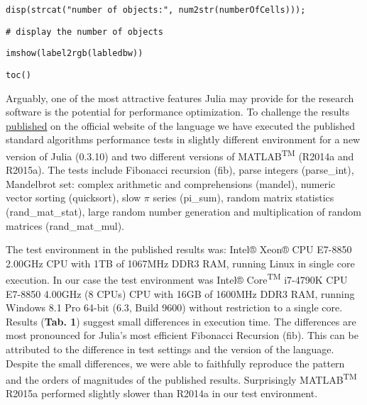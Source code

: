 \verb|disp(strcat("number of objects:", num2str(numberOfCells)));|

\verb|# display the number of objects|

\verb|imshow(label2rgb(labledbw))|

\verb|toc()|



Arguably, one of the most attractive features Julia may provide for the research software is the potential for performance optimization. To challenge the results \href{http://julialang.org/benchmarks/}{published} on the official website of the language we have executed the published standard algorithms performance tests in slightly different environment for a new version of Julia (0.3.10) and two different versions of MATLAB\textsuperscript{TM} (R2014a and R2015a). The tests include Fibonacci recursion (fib), parse integers (parse\_int), Mandelbrot set: complex arithmetic and comprehensions (mandel), numeric vector sorting (quicksort), slow $\pi$ series (pi\_sum), random matrix statistics (rand\_mat\_stat), large random number generation and multiplication of random matrices (rand\_mat\_mul).

The test environment in the published results was: Intel® Xeon® CPU E7-8850 2.00GHz CPU with 1TB of 1067MHz DDR3 RAM, running Linux in single core execution. In our case the test environment was Intel® Core\textsuperscript{TM} i7-4790K CPU E7-8850 4.00GHz (8 CPUs) CPU with 16GB of 1600MHz DDR3 RAM, running Windows 8.1 Pro 64-bit (6.3, Build 9600) without restriction to a single core. Results (\textbf{Tab. 1}) suggest small differences in execution time. The differences are most pronounced for Julia's most efficient Fibonacci Recursion (fib). This can be attributed to the difference in test settings and the version of the language. Despite the small differences, we were able to faithfully reproduce the pattern and the orders of magnitudes of the published results. Surprisingly MATLAB\textsuperscript{TM} R2015a performed slightly slower than R2014a in our test environment.

